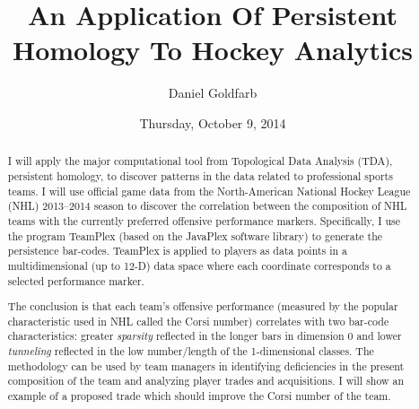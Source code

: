 \documentclass{UAmathtalk}
\author{Daniel Goldfarb}
\title{An Application Of Persistent Homology To Hockey Analytics}
\date{Thursday, October 9, 2014}
\begin{document}
\maketitle

\begin{abstract}
I will apply the major computational tool from Topological Data Analysis (TDA), persistent homology, to discover patterns in the data related to professional sports teams.
I will use official game data from the North-American National Hockey League (NHL) 2013--2014 season to discover the correlation between the composition of NHL teams with the currently preferred offensive performance markers.
Specifically, I use the program TeamPlex (based on the JavaPlex software library) to generate the persistence bar-codes.
TeamPlex is applied to players as data points in a multidimensional (up to 12-D) data space where each coordinate corresponds to a selected performance marker.

The conclusion is that each team's offensive performance (measured by the popular characteristic used in NHL called the Corsi number) correlates with two bar-code characteristics: greater \emph{sparsity} reflected in the longer bars in dimension 0 and lower \emph{tunneling} reflected in the low number/length of the 1-dimensional classes.
The methodology can be used by team managers in identifying deficiencies in the present composition of the team and analyzing player trades and acquisitions.
I will show an example of a proposed trade which should improve the Corsi number of the team.​
\end{abstract}
\end{document}

